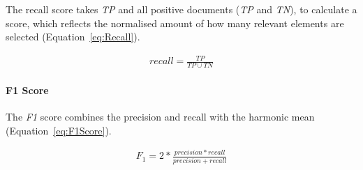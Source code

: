 The recall score takes \textit{TP} and all positive documents (\textit{TP} and \textit{TN}), to calculate a score, which reflects the normalised amount of how many relevant elements are selected (Equation~\ref{eq:Recall}).

\begin{equation} \label{eq:Recall}
\begin{gathered}
recall = \frac{TP}{TP \cup  TN}
\end{gathered}
\end{equation}

\paragraph{F1 Score}
\label{sub:F1Score}
The \textit{F1} score combines the precision and recall with the harmonic mean (Equation~\ref{eq:F1Score}).

\begin{equation} \label{eq:F1Score}
\begin{gathered}
F_{1} = 2 * \frac{precision * recall}{precision + recall}
\end{gathered}
\end{equation}

